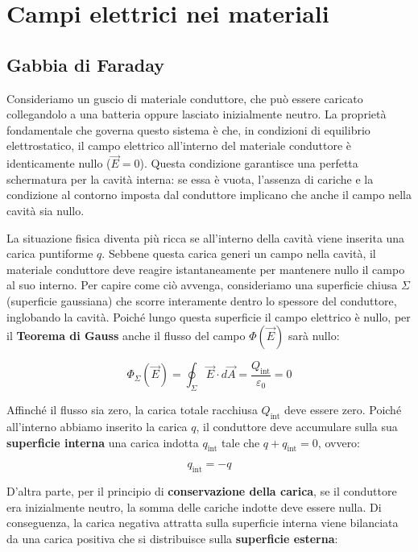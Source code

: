 \documentclass{book}
\begin{document}
\chapter{Campi elettrici nei materiali}


\section{Gabbia di Faraday}

Consideriamo un guscio di materiale conduttore, che può essere caricato collegandolo a una batteria oppure lasciato inizialmente neutro. La proprietà fondamentale che governa questo sistema è che, in condizioni di equilibrio elettrostatico, il campo elettrico all'interno del materiale conduttore è identicamente nullo ($\vec{E} = 0$). Questa condizione garantisce una perfetta schermatura per la cavità interna: se essa è vuota, l'assenza di cariche e la condizione al contorno imposta dal conduttore implicano che anche il campo nella cavità sia nullo.

La situazione fisica diventa più ricca se all'interno della cavità viene inserita una carica puntiforme $q$. Sebbene questa carica generi un campo nella cavità, il materiale conduttore deve reagire istantaneamente per mantenere nullo il campo al suo interno. Per capire come ciò avvenga, consideriamo una superficie chiusa $\Sigma$ (superficie gaussiana) che scorre interamente dentro lo spessore del conduttore, inglobando la cavità. Poiché lungo questa superficie il campo elettrico è nullo, per il \textbf{Teorema di Gauss} anche il flusso del campo $\Phi(\vec{E})$ sarà nullo:

\[
\Phi_{\Sigma}(\vec{E}) = \oint_{\Sigma} \vec{E} \cdot d\vec{A} = \frac{Q_{\text{int}}}{\varepsilon_0} = 0
\]

Affinché il flusso sia zero, la carica totale racchiusa $Q_{\text{int}}$ deve essere zero. Poiché all'interno abbiamo inserito la carica $q$, il conduttore deve accumulare sulla sua \textbf{superficie interna} una carica indotta $q_{\text{int}}$ tale che $q + q_{\text{int}} = 0$, ovvero:

\[
q_{\text{int}} = -q
\]

D'altra parte, per il principio di \textbf{conservazione della carica}, se il conduttore era inizialmente neutro, la somma delle cariche indotte deve essere nulla. Di conseguenza, la carica negativa attratta sulla superficie interna viene bilanciata da una carica positiva che si distribuisce sulla \textbf{superficie esterna}:
\end{document}
